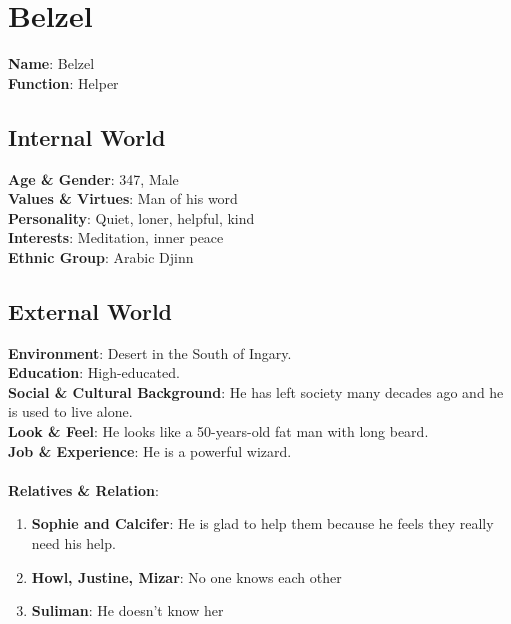 \section{Belzel}

\textbf{Name}: Belzel \\
\textbf{Function}: Helper

\subsection{Internal World}

\textbf{Age \& Gender}: 347, Male \\
\textbf{Values \& Virtues}: Man of his word  \\
\textbf{Personality}: Quiet, loner, helpful, kind \\
\textbf{Interests}: Meditation, inner peace \\
\textbf{Ethnic Group}: Arabic Djinn

\subsection{External World}
\textbf{Environment}: Desert in the South of Ingary.  \\
\textbf{Education}: High-educated. \\
\textbf{Social \& Cultural Background}: He has left society many decades ago and he is used to live alone. \\
\textbf{Look \& Feel}: He looks like a 50-years-old fat man with long beard. \\
\textbf{Job \& Experience}: He is a powerful wizard. \\
\\
\textbf{Relatives \& Relation}:
\begin{enumerate}
\item \textbf{Sophie and Calcifer}: He  is glad to help them because he feels they really need his help.
\item \textbf{Howl, Justine, Mizar}: No one knows each other
\item \textbf{Suliman}: He doesn’t know her
\end{enumerate}


